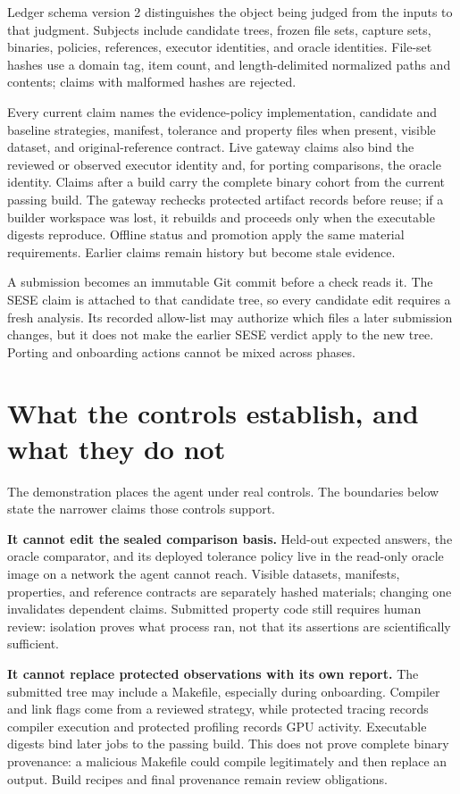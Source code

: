 \documentclass[11pt]{article}
\begin{document}
Ledger schema version 2 distinguishes the object being judged from the inputs
to that judgment. Subjects include candidate trees, frozen file sets, capture
sets, binaries, policies, references, executor identities, and oracle
identities. File-set hashes use a domain tag, item count, and length-delimited
normalized paths and contents; claims with malformed hashes are rejected.

Every current claim names the evidence-policy implementation, candidate and
baseline strategies, manifest, tolerance and property files when present,
visible dataset, and original-reference contract. Live gateway claims also bind
the reviewed or observed executor identity and, for porting comparisons, the
oracle identity. Claims after a build carry the complete binary cohort from the
current passing build. The gateway rechecks protected artifact records before
reuse; if a builder workspace was lost, it rebuilds and proceeds only when the
executable digests reproduce. Offline status and promotion apply the same
material requirements. Earlier claims remain history but become stale evidence.

A submission becomes an immutable Git commit before a check reads it. The SESE
claim is attached to that candidate tree, so every candidate edit requires a
fresh analysis. Its recorded allow-list may authorize which files a later
submission changes, but it does not make the earlier SESE verdict apply to the
new tree. Porting and onboarding actions cannot be mixed across phases.

\section{What the controls establish, and what they do not}

The demonstration places the agent under real controls. The boundaries below
state the narrower claims those controls support.

\textbf{It cannot edit the sealed comparison basis.} Held-out expected answers,
the oracle comparator, and its deployed tolerance policy live in the read-only
oracle image on a network the agent cannot reach. Visible datasets, manifests,
properties, and reference contracts are separately hashed materials; changing
one invalidates dependent claims. Submitted property code still requires human
review: isolation proves what process ran, not that its assertions are
scientifically sufficient.

\textbf{It cannot replace protected observations with its own report.} The
submitted tree may include a Makefile, especially during onboarding. Compiler
and link flags come from a reviewed strategy, while protected tracing records
compiler execution and protected profiling records GPU activity. Executable
digests bind later jobs to the passing build. This does not prove complete
binary provenance: a malicious Makefile could compile legitimately and then
replace an output. Build recipes and final provenance remain review obligations.
\end{document}
